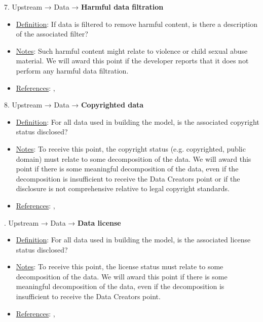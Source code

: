 7. Upstream → Data → \textbf{Harmful data filtration}
\vspace{-\parskip}
\begin{itemize}
\item
\underline{Definition}: If data is filtered to remove harmful content, is there a description of the associated filter?
\item
\underline{Notes}: Such harmful content might relate to violence or child sexual abuse material. We will award this point if the developer reports that it does not perform any harmful data filtration.
\item
\underline{References}: \citet{dodge2021c4}, \citet{longpre2023pretrainer}
\end{itemize} \vspace{\baselineskip}


8. Upstream → Data → \textbf{Copyrighted data}
\vspace{-\parskip}
\begin{itemize}
\item
\underline{Definition}: For all data used in building the model, is the associated copyright status disclosed?
\item
\underline{Notes}: To receive this point, the copyright status (e.g. copyrighted, public domain) must relate to some decomposition of the data. We will award this point if there is some meaningful decomposition of the data, even if the decomposition is insufficient to receive the Data Creators point or if the disclosure is not comprehensive relative to legal copyright standards.
\item
\underline{References}: \citet{bandy2021addressing}, \citet{genlaw2023}
\end{itemize} \vspace{\baselineskip}


. Upstream → Data → \textbf{Data license}
\vspace{-\parskip}
\begin{itemize}
\item
\underline{Definition}: For all data used in building the model, is the associated license status disclosed?
\item
\underline{Notes}: To receive this point, the license status must relate to some decomposition of the data. We will award this point if there is some meaningful decomposition of the data, even if the decomposition is insufficient to receive the Data Creators point.
\item
\underline{References}: \citet{bandy2021addressing}, \citet{genlaw2023}
\end{itemize} \vspace{\baselineskip}


